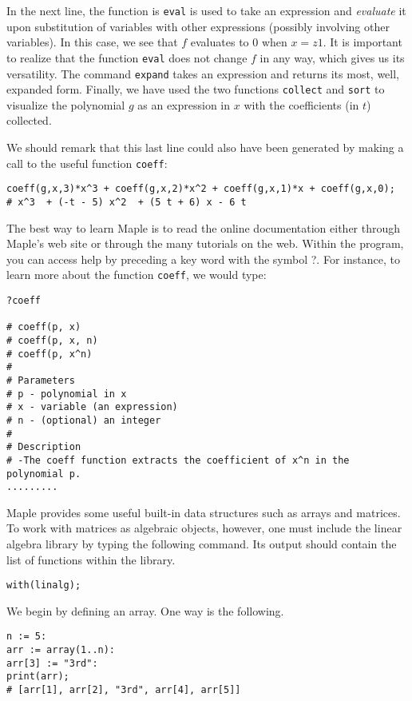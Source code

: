 \documentclass[12pt]{amsart}
\begin{document}
In the next line, the function is \texttt{eval} is used to take an expression and \textit{evaluate} it upon substitution
of variables with other expressions (possibly involving other variables).  In this case,
we see that $f$ evaluates to $0$ when $x = z1$.  It is important to realize that the function \texttt{eval}
does not change $f$ in any way, which gives us its versatility.  The command \texttt{expand} takes 
an expression and returns its most, well, expanded form.  Finally, we have used the two functions
\texttt{collect} and \texttt{sort} to visualize the polynomial $g$ as an expression in $x$ with 
the coefficients (in $t$) collected.

We should remark that this last line could also have been generated by making a call
to the useful function \texttt{coeff}:

\begin{verbatim}
coeff(g,x,3)*x^3 + coeff(g,x,2)*x^2 + coeff(g,x,1)*x + coeff(g,x,0);
# x^3  + (-t - 5) x^2  + (5 t + 6) x - 6 t
\end{verbatim}   

The best way to learn Maple is to read the online documentation either through Maple's web site or 
through the many tutorials on the web.  Within the program, you can access help by preceding 
a key word with the symbol ?.  For instance, to learn more about the function \texttt{coeff}, we would 
type:

\begin{verbatim}
?coeff

# coeff(p, x)
# coeff(p, x, n)
# coeff(p, x^n)
# 
# Parameters
# p - polynomial in x
# x - variable (an expression)
# n - (optional) an integer
# 
# Description
# -The coeff function extracts the coefficient of x^n in the polynomial p. 
.........
\end{verbatim} 

Maple provides some useful built-in data structures such as arrays and matrices.  To work with
matrices as algebraic objects, however, one must include the linear algebra library by typing the 
following command.  Its output should contain the list of functions within the library.

\begin{verbatim}
with(linalg);
\end{verbatim}

We begin by defining an array.  One way is the following.

\begin{verbatim}
n := 5:
arr := array(1..n):
arr[3] := "3rd":
print(arr);
# [arr[1], arr[2], "3rd", arr[4], arr[5]]
\end{verbatim}
\end{document}
